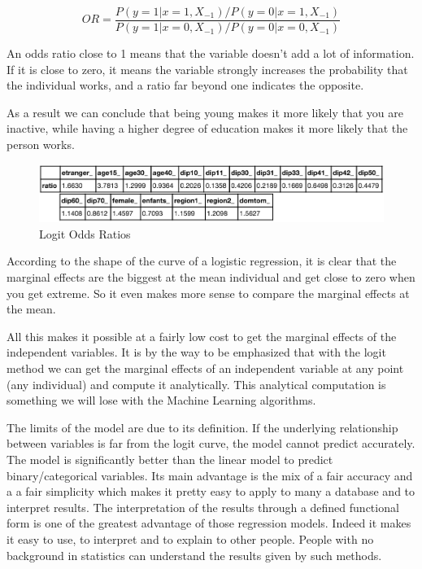 \begin{equation}
OR = \frac{P(y=1|x=1, X_{-1})/P(y=0|x=1, X_{-1})}{P(y=1|x=0, X_{-1})/P(y=0|x=0, X_{-1})}
\end{equation}

An odds ratio close to 1 means that the variable doesn’t add a lot of information. If it is close to zero, it means the variable strongly increases the probability that the individual works, and a ratio far beyond one indicates the opposite.

As a result we can conclude that being young makes it more likely that you are inactive, while having a higher degree of education makes it more likely that the person works.

\begin{figure}
    \centering
    \includegraphics[scale=0.4]{img/logit_odds_ratios}
    \caption{Logit Odds Ratios}
    \label{fig:logit_odds_ratios}
\end{figure}



According to the shape of the curve of a logistic regression, it is clear that the marginal effects are the biggest at the mean individual and get close to zero when you get extreme. So it even makes more sense to compare the marginal effects at the mean.

All this makes it possible at a fairly low cost to get the marginal effects of the independent variables. It is by the way to be emphasized that with the logit method we can get the marginal effects of an independent variable at any point (any individual) and compute it analytically.
This analytical computation is something we will lose with the Machine Learning algorithms.

The limits of the model are due to its definition. If the underlying relationship between variables is far from the logit curve, the model cannot predict accurately. The model is significantly better than the linear model to predict binary/categorical variables.
Its main advantage is the mix of a fair accuracy and a a fair simplicity which makes it pretty easy to apply to many a database and to interpret results.
The interpretation of the results through a defined functional form is one of the greatest advantage of those regression models. Indeed it makes it easy to use, to interpret and to explain to other people. People with no background in statistics can understand the results given by such methods.
